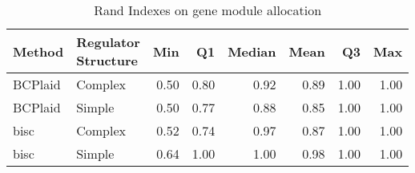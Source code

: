 \begin{table}[ht]
\caption{Rand Indexes on gene module allocation}
\vspace{1.5cm}
\centering
\begin{tabular}{llrrrrrr}
  \toprule
Method & \makecell{Regulator \\ Structure} & Min & Q1 & Median & Mean & Q3 & Max \\ 
  \midrule
BCPlaid & Complex & 0.50 & 0.80 & 0.92 & 0.89 & 1.00 & 1.00 \\ 
  BCPlaid & Simple & 0.50 & 0.77 & 0.88 & 0.85 & 1.00 & 1.00 \\ 
  bisc & Complex & 0.52 & 0.74 & 0.97 & 0.87 & 1.00 & 1.00 \\ 
  bisc & Simple & 0.64 & 1.00 & 1.00 & 0.98 & 1.00 & 1.00 \\ 
   \bottomrule
\end{tabular}
\end{table}
